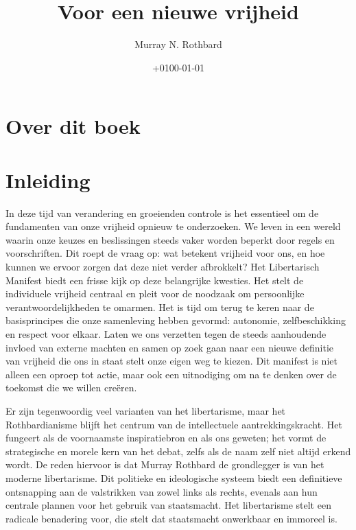 \documentclass[
  a5paper,
  smalldemyvopaper,10pt,twoside,onecolumn,openright,extrafontsizes,hidelinks]{memoir}
\title{Voor een nieuwe vrijheid}
\author{Murray N. Rothbard}
\date{+0100-01-01}
\renewcommand*\contentsname{Inhoudsopgave}
\newcommand\contentsname{Inhoudsopgave}
\begin{document}
\frontmatter
\maketitle

\renewcommand*\contentsname{Inhoudsopgave}
{
\setcounter{tocdepth}{0}
\tableofcontents
}

\mainmatter
{}

\chapter*{Over dit boek}\label{over-dit-boek}



\chapter*{Inleiding}\label{inleiding}


In deze tijd van verandering en groeienden controle is het essentieel om
de fundamenten van onze vrijheid opnieuw te onderzoeken. We leven in een
wereld waarin onze keuzes en beslissingen steeds vaker worden beperkt
door regels en voorschriften. Dit roept de vraag op: wat betekent
vrijheid voor ons, en hoe kunnen we ervoor zorgen dat deze niet verder
afbrokkelt? Het Libertarisch Manifest biedt een frisse kijk op deze
belangrijke kwesties. Het stelt de individuele vrijheid centraal en
pleit voor de noodzaak om persoonlijke verantwoordelijkheden te omarmen.
Het is tijd om terug te keren naar de basisprincipes die onze
samenleving hebben gevormd: autonomie, zelfbeschikking en respect voor
elkaar. Laten we ons verzetten tegen de steeds aanhoudende invloed van
externe machten en samen op zoek gaan naar een nieuwe definitie van
vrijheid die ons in staat stelt onze eigen weg te kiezen. Dit manifest
is niet alleen een oproep tot actie, maar ook een uitnodiging om na te
denken over de toekomst die we willen creëren.

Er zijn tegenwoordig veel varianten van het libertarisme, maar het
Rothbardianisme blijft het centrum van de intellectuele
aantrekkingskracht. Het fungeert als de voornaamste inspiratiebron en
als ons geweten; het vormt de strategische en morele kern van het debat,
zelfs als de naam zelf niet altijd erkend wordt. De reden hiervoor is
dat Murray Rothbard de grondlegger is van het moderne libertarisme. Dit
politieke en ideologische systeem biedt een definitieve ontsnapping aan
de valstrikken van zowel links als rechts, evenals aan hun centrale
plannen voor het gebruik van staatsmacht. Het libertarisme stelt een
radicale benadering voor, die stelt dat staatsmacht onwerkbaar en
immoreel is.
\end{document}
